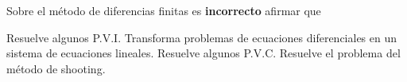 \begin{pregunta}
\begin{cuerpo}
Sobre el m\'etodo de diferencias finitas es \textbf{incorrecto} afirmar que
\end{cuerpo}

\begin{multicols}{2}
\begin{alternativas}
{Resuelve algunos P.V.I.}
{Transforma problemas de ecuaciones diferenciales en un sistema de ecuaciones lineales.}
{Resuelve algunos P.V.C.	}
{Resuelve el problema del m\'etodo de shooting.}
\end{alternativas}
\end{multicols}
\justificacion{0cm}
\end{pregunta}